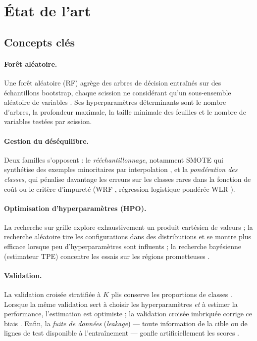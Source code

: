 \section{État de l'art}

\subsection{Concepts clés}
\paragraph{Forêt aléatoire.} Une forêt aléatoire (RF) agrège des arbres de décision entraînés sur des échantillons bootstrap, chaque scission ne considérant qu'un sous-ensemble aléatoire de variables \cite{breiman2001}. Ses hyperparamètres déterminants sont le nombre d'arbres, la profondeur maximale, la taille minimale des feuilles et le nombre de variables testées par scission.

\paragraph{Gestion du déséquilibre.} Deux familles s'opposent : le \emph{rééchantillonnage}, notamment SMOTE qui synthétise des exemples minoritaires par interpolation \cite{chawla2002}, et la \emph{pondération des classes}, qui pénalise davantage les erreurs sur les classes rares dans la fonction de coût ou le critère d'impureté (WRF \cite{chen2004,zhang2016}, régression logistique pondérée WLR \cite{maalouf2014}).

\paragraph{Optimisation d'hyperparamètres (HPO).} La recherche sur grille explore exhaustivement un produit cartésien de valeurs ; la recherche aléatoire tire les configurations dans des distributions et se montre plus efficace lorsque peu d'hyperparamètres sont influents \cite{bergstra2012} ; la recherche bayésienne (estimateur TPE) concentre les essais sur les régions prometteuses \cite{bergstra2011,akiba2019}.

\paragraph{Validation.} La validation croisée stratifiée à $K$ plis conserve les proportions de classes \cite{kohavi1995}. Lorsque la même validation sert à choisir les hyperparamètres \emph{et} à estimer la performance, l'estimation est optimiste ; la validation croisée imbriquée corrige ce biais \cite{cawley2010}. Enfin, la \emph{fuite de données} (\emph{leakage}) --- toute information de la cible ou de lignes de test disponible à l'entraînement --- gonfle artificiellement les scores \cite{kaufman2012}.

